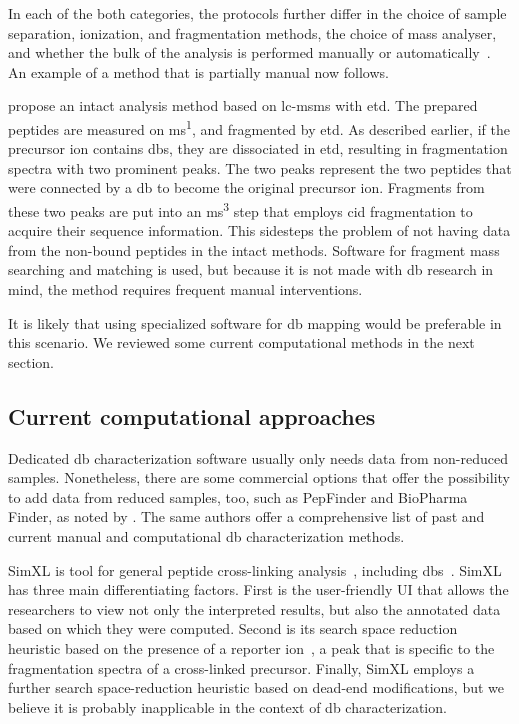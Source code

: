 In each of the both categories, the protocols further differ in the choice of sample separation, ionization, and fragmentation methods, the choice of mass analyser, and whether the bulk of the analysis is performed manually or automatically~\cite{lakbub2018recent}. An example of a method that is partially manual now follows.

\citet{wu2009mass} propose an intact analysis method based on \gls*{lc}-\gls*{msms} with \gls*{etd}\@. The prepared peptides are measured on \gls*{ms}\textsuperscript{1}, and fragmented by \gls*{etd}\@. As described earlier, if the precursor ion contains \glspl*{db}, they are dissociated in \gls*{etd}, resulting in fragmentation spectra with two prominent peaks. The two peaks represent the two peptides that were connected by a \gls*{db} to become the original precursor ion. Fragments from these two peaks are put into an \gls*{ms}\textsuperscript{3} step that employs \gls*{cid} fragmentation to acquire their sequence information. This sidesteps the problem of not having data from the non-bound peptides in the intact methods. Software for fragment mass searching and matching is used, but because it is not made with \gls*{db} research in mind, the method requires frequent manual interventions.

It is likely that using specialized software for \gls*{db} mapping would be preferable in this scenario. We reviewed some current computational methods in the next section.

\subsection{Current computational approaches}

Dedicated \gls*{db} characterization software usually only needs data from non-reduced samples. Nonetheless, there are some commercial options that offer the possibility to add data from reduced samples, too, such as PepFinder and BioPharma Finder, as noted by \citet{lakbub2018recent}. The same authors offer a comprehensive list of past and current manual and computational \gls*{db} characterization methods.

SimXL is tool for general peptide cross-linking analysis~\cite{lima2015sim}, including \glspl*{db}~\cite{cui2019comprehensive}. SimXL has three main differentiating factors. First is the user-friendly UI that allows the researchers to view not only the interpreted results, but also the annotated data based on which they were computed. Second is its search space reduction heuristic based on the presence of a reporter ion~\cite{iglesias2010identification}, a peak that is specific to the fragmentation spectra of a cross-linked precursor. Finally, SimXL employs a further search space-reduction heuristic based on dead-end modifications, but we believe it is probably inapplicable in the context of \gls*{db} characterization.

